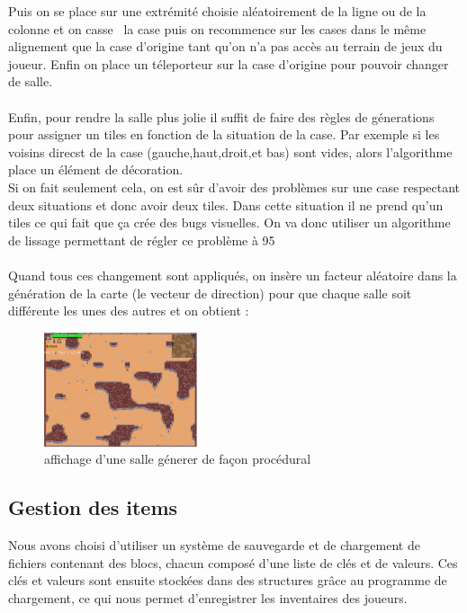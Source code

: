 \documentclass[a4paper,11pt]{article}
\begin{document}
Puis on se place sur une extrémité choisie aléatoirement de la ligne ou de la colonne et on \guillemotleft casse \guillemotright \ la case puis on recommence sur les cases dans le même alignement que la case d'origine tant qu'on n'a pas accès au terrain de jeux du joueur.
Enfin on place un téleporteur sur la case d'origine pour pouvoir changer de salle.
\\\\
Enfin, pour rendre la salle plus jolie il suffit de faire des règles de génerations pour assigner un tiles en fonction de la situation de la case. Par exemple si les voisins direcst de la case (gauche,haut,droit,et bas) sont vides, alors l'algorithme place un élément de décoration.\\
Si on fait seulement cela, on est sûr d'avoir des problèmes sur une case respectant deux situations et donc avoir deux tiles. Dans cette situation il ne prend qu'un tiles ce qui fait que ça crée des bugs visuelles. On va donc utiliser un algorithme de lissage permettant de régler ce problème à 95%
\\\\
Quand tous ces changement sont appliqués, on insère un facteur aléatoire dans la génération de la carte (le vecteur de direction) pour que chaque salle soit différente les unes des autres et on obtient : 

\begin{figure}[h]
\centering
\includegraphics[width=0.4\textwidth]{./img/SalleFinal.png}
\caption{affichage d'une salle génerer de façon procédural}
\label{fig:affichage de la salle final}
\end{figure}
\newpage

\subsection{Gestion des items}


Nous avons choisi d'utiliser un système de sauvegarde et de chargement de fichiers contenant des blocs, chacun composé d'une liste de clés et de valeurs. Ces clés et valeurs sont ensuite stockées dans des structures grâce au programme de chargement, ce qui nous permet d'enregistrer les inventaires des joueurs.\
\end{document}
